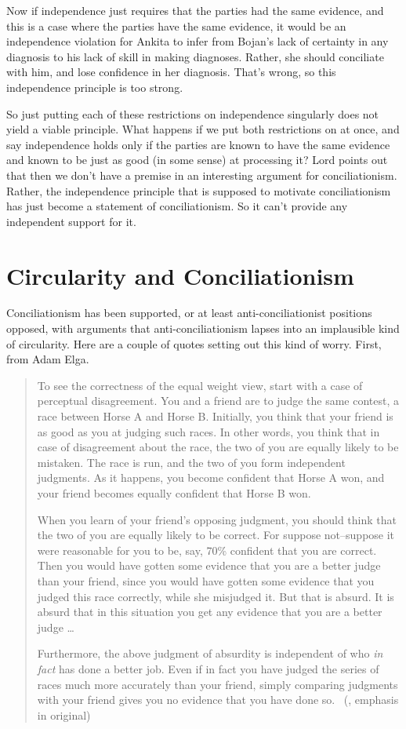 \documentclass[
  10pt,
  letterpaper,
  twoside]{scrbook}
\begin{document}
Now if independence just requires that the parties had the same
evidence, and this is a case where the parties have the same evidence,
it would be an independence violation for {Ankita} to infer from
{Bojan}'s lack of certainty in any diagnosis to his lack of skill in
making diagnoses. Rather, she should conciliate with him, and lose
confidence in her diagnosis. That's wrong, so this independence
principle is too strong.

So just putting each of these restrictions on independence singularly
does not yield a viable principle. What happens if we put both
restrictions on at once, and say independence holds only if the parties
are known to have the same evidence and known to be just as good (in
some sense) at processing it? Lord points out that then we don't have a
premise in an interesting argument for conciliationism. Rather, the
independence principle that is supposed to motivate conciliationism has
just become a statement of conciliationism. So it can't provide any
independent support for it.

\section{Circularity and
Conciliationism}\label{circularityandconciliationism}

Conciliationism has been supported, or at least anti-conciliationist
positions opposed, with arguments that anti-conciliationism lapses into
an implausible kind of circularity. Here are a couple of quotes setting
out this kind of worry. First, from Adam Elga.

\begin{quote}
To see the correctness of the equal weight view, start with a case of
perceptual disagreement. You and a friend are to judge the same contest,
a race between Horse A and Horse B. Initially, you think that your
friend is as good as you at judging such races. In other words, you
think that in case of disagreement about the race, the two of you are
equally likely to be mistaken. The race is run, and the two of you form
independent judgments. As it happens, you become confident that Horse A
won, and your friend becomes equally confident that Horse B won.

When you learn of your friend's opposing judgment, you should think that
the two of you are equally likely to be correct. For suppose
not--suppose it were reasonable for you to be, say, 70\% confident that
you are correct. Then you would have gotten some evidence that you are a
better judge than your friend, since you would have gotten some evidence
that you judged this race correctly, while she misjudged it. But that is
absurd. It is absurd that in this situation you get any evidence that
you are a better judge \ldots{}

Furthermore, the above judgment of absurdity is independent of who
\emph{in fact} has done a better job. Even if in fact you have judged
the series of races much more accurately than your friend, simply
comparing judgments with your friend gives you no evidence that you have
done so. ~(, emphasis in
original)
\end{quote}
\end{document}
